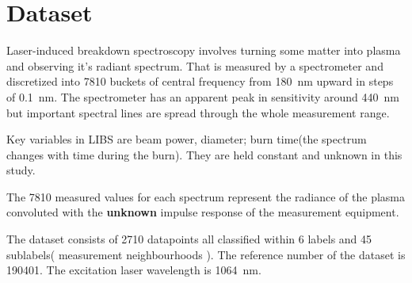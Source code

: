 \documentclass{article}
\begin{document}
\section{Dataset}
Laser-induced breakdown spectroscopy\cite{libs_intro} involves turning some matter into plasma and observing it's radiant spectrum.
That is measured by a spectrometer and discretized into 7810 buckets of central frequency from  \SI{180}{\nano\metre} upward in steps of \SI{0.1}{\nano\metre}.
The spectrometer has an apparent peak in sensitivity around \SI{440}{\nano\metre} but important spectral lines are spread through the whole measurement range.
\par
Key variables in LIBS are beam power, diameter; burn time(the spectrum changes with time during the burn).
They are held constant and unknown in this study.
\par
The 7810 measured values for each spectrum represent the radiance\cite{radiance} of the plasma convoluted with the \textbf{unknown} impulse response of the measurement equipment.
\par
The dataset consists of 2710 datapoints all classified within 6 labels and 45 sublabels( measurement neighbourhoods ).
The reference number of the dataset is 190401.
The excitation laser wavelength is \SI{1064}{\nano\metre}.
\end{document}
